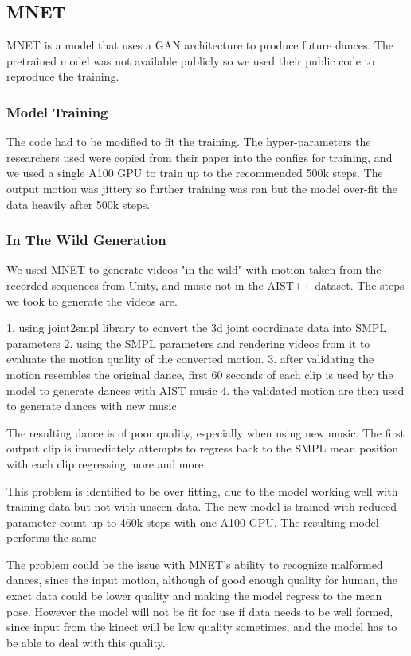 \documentclass[final,5p,times,authoryear]{article}
\begin{document}
\subsection{MNET}

MNET is a model that uses a GAN architecture to produce future dances. The
pretrained model was not available publicly so we used their public code to
reproduce the training.

\subsubsection{Model Training}

The code had to be modified to fit the training. The hyper-parameters the
researchers used were copied from their paper into the configs for training, and
we used a single A100 GPU to train up to the recommended 500k steps. The output
motion was jittery so further training was ran but the model over-fit the data
heavily after 500k steps.

\subsubsection{In The Wild Generation}
We used MNET to generate videos "in-the-wild" with motion taken from the
recorded sequences from Unity, and music not in the AIST++ dataset. The steps we
took to generate the videos are.

1. using joint2smpl library to convert the 3d joint coordinate data into SMPL
parameters
2. using the SMPL parameters and rendering videos from it to evaluate the motion
quality of the converted motion.
3. after validating the motion resembles the original dance, first 60 seconds of
each clip is used by the model to generate dances with AIST music 
4. the validated motion are then used to generate dances with new music

The resulting dance is of poor quality, especially when using new music. The
first output clip is immediately attempts to regress back to the SMPL mean
position with each clip regressing more and more.

This problem is identified to be over fitting, due to the model working well with
training data but not with unseen data. The new model is trained with reduced
parameter count up to 460k steps with one A100 GPU. The resulting model performs
the same

The problem could be the issue with MNET's ability to recognize malformed
dances, since the input motion, although of good enough quality for human, the
exact data could be lower quality and making the model regress to the mean pose.
However the model will not be fit for use if data needs to be well formed, since
input from the kinect will be low quality sometimes, and the model has to be
able to deal with this quality.
\end{document}
